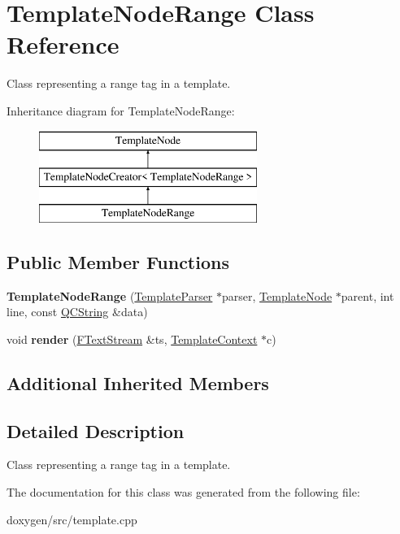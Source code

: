 \hypertarget{class_template_node_range}{}\section{Template\+Node\+Range Class Reference}
\label{class_template_node_range}


Class representing a \textquotesingle{}range\textquotesingle{} tag in a template.  


Inheritance diagram for Template\+Node\+Range\+:\begin{figure}[H]
\begin{center}
\leavevmode
\includegraphics[height=3.000000cm]{class_template_node_range}
\end{center}
\end{figure}
\subsection*{Public Member Functions}
\begin{DoxyCompactItemize}
\item 
\mbox{\label{class_template_node_range_a7d5a86369700e268fca471f7a3277f8b}} 
{\bfseries Template\+Node\+Range} (\mbox{\hyperlink{class_template_parser}{Template\+Parser}} $\ast$parser, \mbox{\hyperlink{class_template_node}{Template\+Node}} $\ast$parent, int line, const \mbox{\hyperlink{class_q_c_string}{Q\+C\+String}} \&data)
\item 
\mbox{\label{class_template_node_range_ad0b18f4c88b8716442c8cd9e868d7815}} 
void {\bfseries render} (\mbox{\hyperlink{class_f_text_stream}{F\+Text\+Stream}} \&ts, \mbox{\hyperlink{class_template_context}{Template\+Context}} $\ast$c)
\end{DoxyCompactItemize}
\subsection*{Additional Inherited Members}


\subsection{Detailed Description}
Class representing a \textquotesingle{}range\textquotesingle{} tag in a template. 

The documentation for this class was generated from the following file\+:\begin{DoxyCompactItemize}
\item 
doxygen/src/template.\+cpp\end{DoxyCompactItemize}
